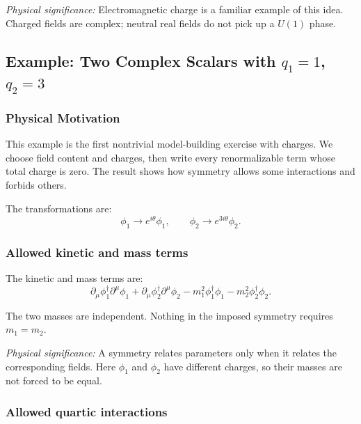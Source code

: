 \documentclass[../main.tex]{subfiles}
\begin{document}
\textit{Physical significance:} Electromagnetic charge is a familiar example of this idea.  Charged fields are complex; neutral real fields do not pick up a $U(1)$ phase.

\subsection*{Example: Two Complex Scalars with $q_1=1$, $q_2=3$}

\subsubsection*{Physical Motivation}

This example is the first nontrivial model-building exercise with charges.  We choose field content and charges, then write every renormalizable term whose total charge is zero.  The result shows how symmetry allows some interactions and forbids others.

The transformations are:
\begin{equation}
  \boxed{
  \phi_1\to e^{i\theta}\phi_1,
  \qquad
  \phi_2\to e^{3i\theta}\phi_2.}
  \label{eq:lec09:q1-q2-transformations}
\end{equation}

\subsubsection*{Allowed kinetic and mass terms}

The kinetic and mass terms are:
\begin{equation}
  \boxed{
  \partial_\mu\phi_1^\dagger\partial^\mu\phi_1
  +
  \partial_\mu\phi_2^\dagger\partial^\mu\phi_2
  -
  m_1^2\phi_1^\dagger\phi_1
  -
  m_2^2\phi_2^\dagger\phi_2.}
  \label{eq:lec09:two-scalar-kinetic-mass}
\end{equation}

The two masses are independent.  Nothing in the imposed symmetry requires $m_1=m_2$.

\textit{Physical significance:} A symmetry relates parameters only when it relates the corresponding fields.  Here $\phi_1$ and $\phi_2$ have different charges, so their masses are not forced to be equal.

\subsubsection*{Allowed quartic interactions}
\end{document}
